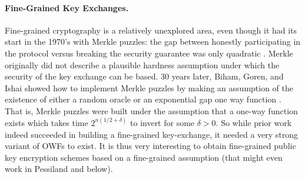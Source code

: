 \paragraph{Fine-Grained Key Exchanges.} Fine-grained cryptography is a relatively unexplored area, even though it had its start in the 1970's with Merkle puzzles: the gap between honestly participating in the protocol versus breaking the security guarantee was only quadratic \cite{Merkle78}. Merkle originally did not describe a plausible hardness assumption under which the security of the key exchange can be based. 30 years later, Biham, Goren, and Ishai showed how to implement Merkle puzzles by making an assumption of the existence of either a random oracle or an exponential gap one way function \cite{BGI08}. That is, Merkle puzzles were built under the assumption that a one-way function exists which takes time $2^{n(1/2+\delta)}$ to invert for some $\delta>0$. So while prior work indeed succeeded in building a fine-grained key-exchange, it needed a very strong variant of OWFs to exist. It is thus very interesting to obtain fine-grained public key encryption schemes based on a fine-grained assumption (that might even work in Pessiland and below).



